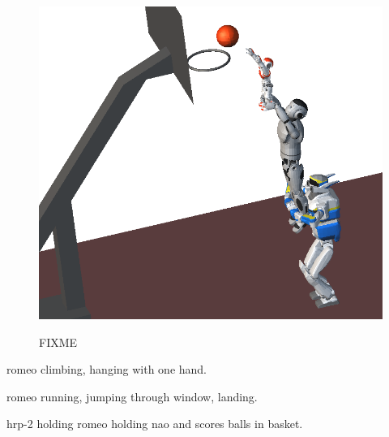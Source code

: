 \begin{figure}
  \centering
      {\includegraphics[width = 0.8\linewidth]
        {src/chap4-conclusion/basketball-side.png}}
      \caption{FIXME}
      \label{fig:chap4-basketball}
\end{figure}

romeo climbing, hanging with one hand.

romeo running, jumping through window, landing.

hrp-2 holding romeo holding nao and scores balls in basket.

